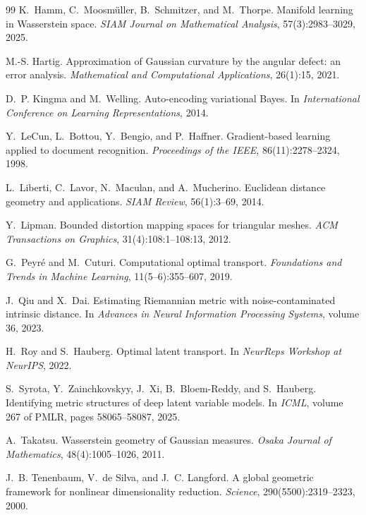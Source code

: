 \begin{thebibliography}{99}
K.~Hamm, C.~Moosm\"uller, B.~Schmitzer, and M.~Thorpe.
\newblock Manifold learning in Wasserstein space.
\newblock \emph{SIAM Journal on Mathematical Analysis},
57(3):2983--3029, 2025.

M.-S. Hartig.
\newblock Approximation of Gaussian curvature by the angular defect: an error
analysis.
\newblock \emph{Mathematical and Computational Applications}, 26(1):15, 2021.

D.~P. Kingma and M.~Welling.
\newblock Auto-encoding variational Bayes.
\newblock In \emph{International Conference on Learning Representations}, 2014.

Y.~LeCun, L.~Bottou, Y.~Bengio, and P.~Haffner.
\newblock Gradient-based learning applied to document recognition.
\newblock \emph{Proceedings of the IEEE}, 86(11):2278--2324, 1998.

L.~Liberti, C.~Lavor, N.~Maculan, and A.~Mucherino.
\newblock Euclidean distance geometry and applications.
\newblock \emph{SIAM Review}, 56(1):3--69, 2014.

Y.~Lipman.
\newblock Bounded distortion mapping spaces for triangular meshes.
\newblock \emph{ACM Transactions on Graphics}, 31(4):108:1--108:13, 2012.

G.~Peyr\'e and M.~Cuturi.
\newblock Computational optimal transport.
\newblock \emph{Foundations and Trends in Machine Learning},
11(5--6):355--607, 2019.

J.~Qiu and X.~Dai.
\newblock Estimating Riemannian metric with noise-contaminated intrinsic
distance.
\newblock In \emph{Advances in Neural Information Processing Systems},
volume 36, 2023.

H.~Roy and S.~Hauberg.
\newblock Optimal latent transport.
\newblock In \emph{NeurReps Workshop at NeurIPS}, 2022.

S.~Syrota, Y.~Zainchkovskyy, J.~Xi, B.~Bloem-Reddy, and S.~Hauberg.
\newblock Identifying metric structures of deep latent variable models.
\newblock In \emph{ICML}, volume 267 of PMLR, pages 58065--58087, 2025.

A.~Takatsu.
\newblock Wasserstein geometry of Gaussian measures.
\newblock \emph{Osaka Journal of Mathematics}, 48(4):1005--1026, 2011.

J.~B. Tenenbaum, V.~de Silva, and J.~C. Langford.
\newblock A global geometric framework for nonlinear dimensionality reduction.
\newblock \emph{Science}, 290(5500):2319--2323, 2000.

\end{thebibliography}
